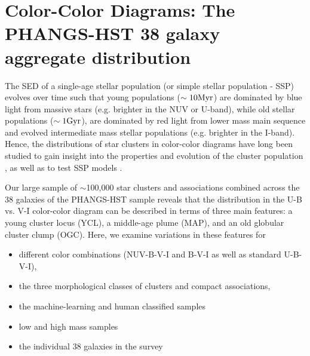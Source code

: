 \documentclass[]{aastex631}
\begin{document}
\section{Color-Color Diagrams: The PHANGS-HST 38 galaxy aggregate distribution}\label{sect:color_color}
The SED of a single-age stellar population (or simple stellar population - SSP) evolves over time such that young populations ($\sim 10 {\rm Myr}$) are dominated by blue light from massive stars (e.g. brighter in the NUV or U-band), while old stellar populations ($\sim 1 {\rm Gyr}$), are dominated by red light from lower mass main sequence and evolved intermediate mass stellar populations (e.g. brighter in the I-band).  
Hence, the distributions of star clusters in color-color diagrams have long been studied to gain insight into the properties and evolution of the cluster population 
\citep[e.g.,][]{van_den_bergh_ubv_1968,searle_classification_1980,
girardi_age_1995, larsen_young_1999, chandar_luminosity_2010, adamo_legacy_2017}, 
as well as to test SSP models \citep[e.g.,][]{bruzual_stellar_2003,vazquez_optimization_2005,maraston_evolutionary_1998}.


Our large sample of $\sim$100,000 star clusters and associations combined across the 38 galaxies of the PHANGS-HST sample reveals that the distribution in the U-B vs. V-I color-color diagram can be described in terms of three main features: a young cluster locus (YCL), a middle-age plume (MAP), and an old globular cluster clump (OGC). Here, we examine variations in these features for 
\begin{itemize}
\item different color combinations (NUV-B-V-I and B-V-I as well as standard U-B-V-I), 
\item the three morphological classes of clusters and compact associations, 
\item the machine-learning and human classified samples
\item low and high mass samples
\item the individual 38 galaxies in the survey
\end{itemize}
\end{document}
